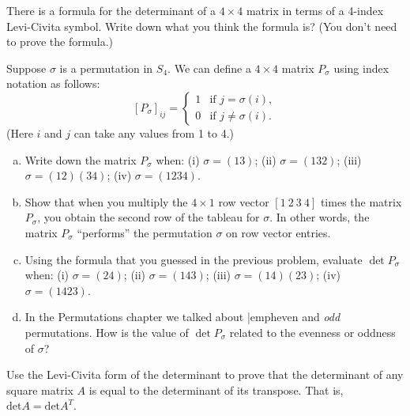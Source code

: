 \begin{exercise}
There is a formula for the determinant of a $4 \times 4$  matrix in terms of a 4-index Levi-Civita symbol. Write down what you think the formula is? (You don't need to prove the formula.)
\end{exercise}

\begin{exercise}
Suppose $\sigma$ is a permutation in $S_4$. We can define a $4 \times 4$ matrix $P_{\sigma}$ using index notation as follows:  
\[ [P_{\sigma}]_{ij} = \begin{cases} 1 &\mbox{if } j = \sigma(i), \\ 
 0 &\mbox{if } j \neq  \sigma(i).  \end{cases} \]
(Here $i$ and $j$ can take any values from 1 to 4.)  
\begin{enumerate}[(a)]
\item
Write down the matrix $P_{\sigma}$ when: (i) $\sigma = (13)$; (ii) $\sigma = (132)$; (iii) $\sigma = (12)(34)$; (iv)  $\sigma = (1234)$.
\item
Show that when you multiply the $4 \times 1$ row vector $[1~2~3~4]$ times the matrix $P_{\sigma}$, you obtain the second row of the tableau for $\sigma$.  In other words, the matrix $P_{\sigma}$ ``performs'' the permutation $\sigma$ on row vector entries.
\item
Using the formula that you guessed in the previous problem, evaluate $\det P_{\sigma}$ when: (i) $\sigma = (24)$; (ii) $\sigma = (143)$; (iii) $\sigma = (14)(23)$; (iv)  $\sigma = (1423)$.
\item
In the Permutations chapter we talked about |emph{even} and \emph{odd} permutations.  How is the value of $\det P_{\sigma}$  related to the evenness or oddness of $\sigma$?
\end{enumerate}
\end{exercise}

\begin{exercise}
Use the Levi-Civita form of the determinant to prove that the determinant of any square matrix $A$ is equal to the determinant of its transpose.  That is, $\text{det} A = \text{det}A^{T}$.
\end{exercise}

